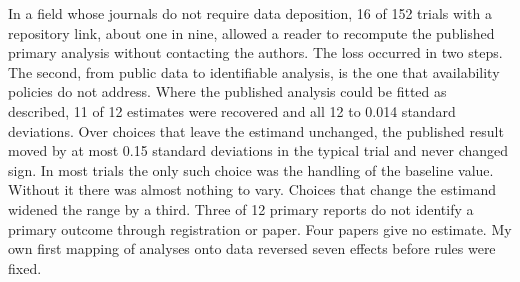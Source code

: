 In a field whose journals do not require data deposition, 16 of 152 trials with a repository link, about one in nine, allowed a reader to recompute the published primary analysis without contacting the authors. The loss occurred in two steps. The second, from public data to identifiable analysis, is the one that availability policies do not address. Where the published analysis could be fitted as described, 11 of 12 estimates were recovered and all 12 to 0.014 standard deviations. Over choices that leave the estimand unchanged, the published result moved by at most 0.15 standard deviations in the typical trial and never changed sign. In most trials the only such choice was the handling of the baseline value. Without it there was almost nothing to vary. Choices that change the estimand widened the range by a third. Three of 12 primary reports do not identify a primary outcome through registration or paper. Four papers give no estimate. My own first mapping of analyses onto data reversed seven effects before rules were fixed.
